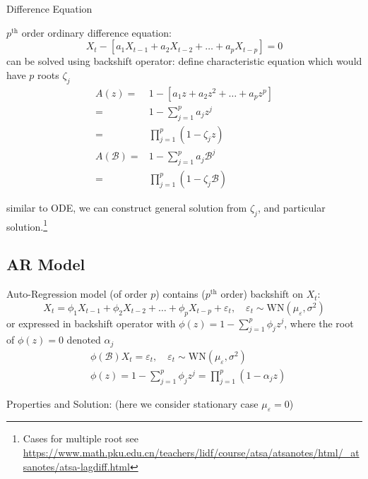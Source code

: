 \begin{point}
    Difference Equation
\end{point}

    $ p^\mathrm{th}  $ order ordinary difference equation:
    \begin{equation}
        X_t-\left[a_1X_{t-1}+a_2X_{t-2}+\ldots+a_pX_{t-p}\right]=0 
    \end{equation}
    can be solved using backshift operator: define characteristic equation which would have $ p $ roots $ \zeta _j $
    \begin{align}
        A(z)=&1-\left[a_1z+a_2z^2+\ldots+a_pz^p\right]\\
        =&1-\sum_{j=1}^pa_jz^j\\
        =&\prod_{j=1}^p(1-\zeta _jz)\\
        A(\mathscr{B} )=&1-\sum_{j=1}^pa_j\mathscr{B} ^j\\
        =&\prod_{j=1}^p(1-\zeta _j\mathscr{B} )
    \end{align}
    
    similar to ODE, we can construct general solution from $ \zeta _j $, and particular solution.\footnote{Cases for multiple root see \url{https://www.math.pku.edu.cn/teachers/lidf/course/atsa/atsanotes/html/_atsanotes/atsa-lagdiff.html}}

\subsection{AR Model}
    Auto-Regression model (of order $ p $) contains ($ p^\mathrm{th} $ order) backshift on $ X_t $:
    \begin{equation}
        X_t=\phi _1X_{t-1}+\phi _2X_{t-2}+\ldots+\phi _pX_{t-p}+\varepsilon _t,\quad \varepsilon _t\sim \mathrm{WN}(\mu_\varepsilon  ,\sigma ^2)  
    \end{equation}
    or expressed in backshift operator with $ \phi (z)=1-\sum_{j=1}^p\phi _jz^j $, where the root of $ \phi (z)=0 $ denoted $ \alpha _j $
    \begin{align}
        &\phi (\mathscr{B} )X_t=\varepsilon _t,\quad\varepsilon _t\sim \mathrm{WN}(\mu_\varepsilon  ,\sigma ^2)   \\
        &\phi (z)=1-\sum_{j=1}^p\phi _jz^j=\prod_{j=1}^p(1-\alpha _jz)
    \end{align}

\begin{point}
    Properties and Solution: (here we consider stationary case $ \mu_\varepsilon  =0 $)
\end{point}

